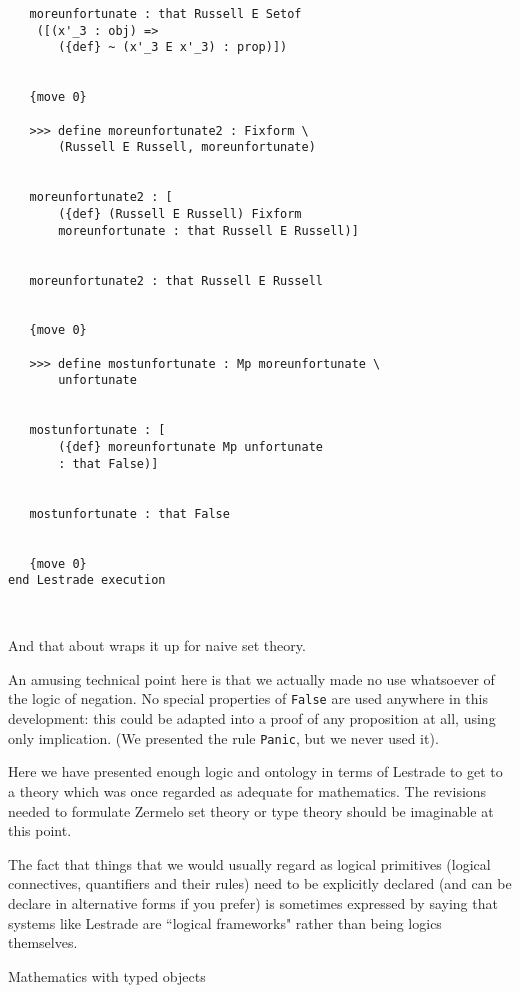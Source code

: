 \documentclass{slides}
\begin{document}
{\begin{slide}
{\begin{verbatim}
   moreunfortunate : that Russell E Setof 
    ([(x'_3 : obj) => 
       ({def} ~ (x'_3 E x'_3) : prop)])


   {move 0}

   >>> define moreunfortunate2 : Fixform \
       (Russell E Russell, moreunfortunate)


   moreunfortunate2 : [
       ({def} (Russell E Russell) Fixform 
       moreunfortunate : that Russell E Russell)]


   moreunfortunate2 : that Russell E Russell


   {move 0}

   >>> define mostunfortunate : Mp moreunfortunate \
       unfortunate


   mostunfortunate : [
       ({def} moreunfortunate Mp unfortunate 
       : that False)]


   mostunfortunate : that False


   {move 0}
end Lestrade execution



\end{verbatim}
}

\end{slide}
\begin{slide}
\small
And that about wraps it up for naive set theory.

An amusing technical point here is that we actually made no use whatsoever of the logic of negation. No special properties of {\tt False} are used anywhere in this development:  this could be adapted into a proof of any proposition at all, using only implication.  (We presented the rule {\tt Panic}, but we never used it).

Here we have presented enough logic and ontology in terms of Lestrade to get to a theory which was once regarded as adequate for mathematics.  The revisions needed to formulate Zermelo set theory or type theory should be imaginable at this point.

The fact that things that we would usually regard as logical primitives (logical connectives, quantifiers and their rules) need to be explicitly declared (and can be declare in alternative forms if you prefer) is sometimes expressed by saying that systems like Lestrade are ``logical frameworks" rather than being logics themselves.


\end{slide}

\begin{slide}

{\Large Mathematics with typed objects}


\end{slide}}
\end{document}
